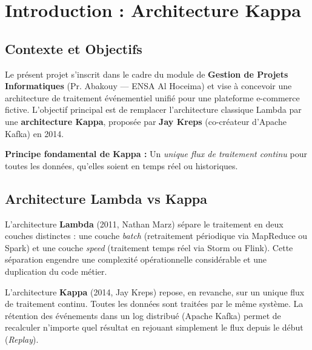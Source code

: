 \chapter{Introduction : Architecture Kappa}

\section{Contexte et Objectifs}

Le présent projet s'inscrit dans le cadre du module de \textbf{Gestion de Projets Informatiques} (Pr. Abakouy --- ENSA Al Hoceima) et vise à concevoir une architecture de traitement événementiel unifié pour une plateforme e-commerce fictive. L'objectif principal est de remplacer l'architecture classique Lambda par une \textbf{architecture Kappa}, proposée par \textbf{Jay Kreps} (co-créateur d'Apache Kafka) en 2014.

\begin{infobox}
    \centering
    \vspace{0.3cm}
    {\large \textbf{Principe fondamental de Kappa :} Un \textit{unique flux de traitement continu} pour toutes les données, qu'elles soient en temps réel ou historiques.}
    \vspace{0.3cm}
\end{infobox}

\section{Architecture Lambda vs Kappa}

L'architecture \textbf{Lambda} (2011, Nathan Marz) sépare le traitement en deux couches distinctes : une couche \textit{batch} (retraitement périodique via MapReduce ou Spark) et une couche \textit{speed} (traitement temps réel via Storm ou Flink). Cette séparation engendre une complexité opérationnelle considérable et une duplication du code métier.

L'architecture \textbf{Kappa} (2014, Jay Kreps) repose, en revanche, sur un unique flux de traitement continu. Toutes les données sont traitées par le même système. La rétention des événements dans un log distribué (Apache Kafka) permet de recalculer n'importe quel résultat en rejouant simplement le flux depuis le début (\textit{Replay}).

